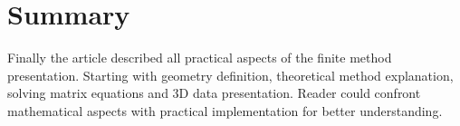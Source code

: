 

\section{Summary}

Finally the article described all practical aspects of the finite method presentation. Starting with geometry definition, theoretical method explanation, solving matrix equations and 3D data presentation. Reader could confront mathematical aspects with practical implementation for better understanding.


